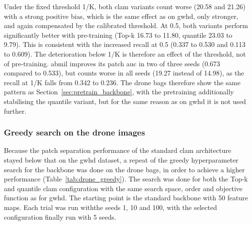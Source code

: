 \documentclass[12pt,parskip = half, DIV=classic,listof=totoc]{scrartcl}
\begin{document}
			Under the fixed threshold 1/K, both \ac{clam} variants count worse (20.58 and 21.26) with a strong positive bias,
			which is the same effect as on \ac{gwhd}, only stronger, and again compensated by the calibrated threshold. 
			At 0.5, both variants perform significantly better with pre-training (Top-k 16.73 to 11.80, quantile 23.03 to 9.79). 
			This is consistent with the increased recall at 0.5 (0.337 to 0.530 and 0.113 to 0.609). The deterioration below 1/K is therefore
			an effect of the threshold, not of pre-training. 
			\Ac{abmil} improves its patch \ac{auc} in two of three seeds (0.673 compared to 0.533), but counts worse in all 
			seeds (19.27 instead of 14.98), as the recall at 1/K falls from 0.342 to 0.236. The drone bags 
			therefore show the same pattern as Section~\ref{sec:pretrain_backbone}, with the pretraining additionally stabilising 
			the quantile variant, but for the same reason as on \ac{gwhd} it is not used further. 

			\subsubsection{Greedy search on the drone images}\label{sec:drone_greedy}
			Because the patch separation performance of the standard \ac{clam} architecture stayed below that on the \ac{gwhd} dataset, a repeat of the 
			greedy hyperparameter search for the backbone was done on the drone bags, in order to achieve a higher performance (Table~\ref{tab:drone_greedy}). 
			The search was done for both the Top-k and quantile \ac{clam} configuration with the same
			search space, order and objective function as
			for \ac{gwhd}. The starting point is the standard backbone with 50 feature maps. Each trial
			was run withthe seeds 1, 10 and 100, with the selected configuration finally run with 5 seeds.
\end{document}
